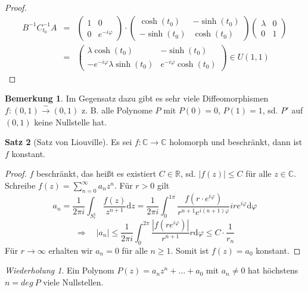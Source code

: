 \documentclass[11pt,titlepage]{article}
\theoremstyle{definition}
\newtheorem{theorem}{Satz}[section]
\newtheorem{remark}[theorem]{Bemerkung}
\theoremstyle{remark}
\newtheorem*{repetition}{Wiederholung}
\begin{document}
\begin{proof}
		\begin{eqnarray*}
			B^{-1}C_{t_0}^{-1} A &=& \begin{pmatrix}1&0\\0&e^{-i\varphi}\end{pmatrix}\cdot 
			\begin{pmatrix}\cosh(t_0)&-\sinh(t_0)\\-\sinh(t_0)&\cosh(t_0)\end{pmatrix}
			\begin{pmatrix}\lambda&0\\0&1\end{pmatrix}\\
			&=&\begin{pmatrix} \lambda \cosh(t_0)&-\sinh(t_0)\\-e^{-i\varphi}\lambda\sinh(t_0) &
			e^{-i\varphi}\cosh(t_0)\end{pmatrix}\in U(1,1)
		\end{eqnarray*}
	\end{proof}
	
	\begin{remark}
		Im Gegensatz dazu gibt es sehr viele Diffeomorphismen $f:(0,1)\overset{\sim}{\to}(0,1)$ 
		z. B. alle Polynome $P$ mit $P(0)=0$, $P(1)=1$, sd. $P'$ auf $(0,1)$ keine Nullstelle hat.
	\end{remark}
	
	\begin{theorem}[Satz von Liouville] \label{thm:LV}
		Es sei $f:\mathbb{C}\to\mathbb{C}$ holomorph und beschränkt, dann ist $f$ konstant.
	\end{theorem}
	
	\begin{proof}
		$f$ beschränkt, das heißt es existiert $C\in\mathbb{R}$, sd. $|f(z)|\leq C$ für alle 
		$z\in\mathbb{C}$. Schreibe $f(z)=\sum_{n=0}^{\infty} a_n z^n$. Für $r>0$ gilt
		\[a_n=\frac{1}{2\pi i}\int_{S_r^1}\frac{f(z)}{z^{n+1}}\mathrm{d}z =
		\frac{1}{2\pi i}\int_0^{1\pi}\frac{f(r\cdot e^{i\varphi})}{r^{n+1}e^{i(n+1)\varphi}}ire^{i\varphi}
		\mathrm{d}\varphi \]
		\[ \Rightarrow\quad |a_n|\leq \frac{1}{2\pi i}\int_0^{2\pi}\frac{|f(re^{i\varphi})|}{r^{n+1}}r 
		\mathrm{d}\varphi\leq C\cdot \frac{1}{r_n} \]
		Für $r\to\infty$ erhalten wir $a_n =0$ für alle $n\geq 1$. Somit ist $f(z)=a_0$ konstant.
	\end{proof}
	
	\begin{repetition}
		Ein Polynom $P(z)=a_n z^n+\ldots +a_0$ mit $a_n\neq 0$ hat höchstens $n=deg\ P$ viele 
		Nullstellen.
	\end{repetition}
	
\end{document}
